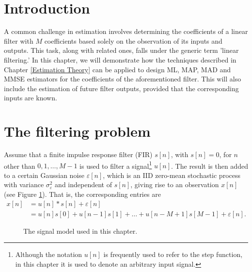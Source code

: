 
\section{Introduction}

A common challenge in estimation involves determining the coefficients of a linear filter with $M$ coefficients based solely on the observation of its inputs and outputs. This task, along with related ones, falls under the generic term 'linear filtering.' In this chapter, we will demonstrate how the techniques described in Chapter \ref{Estimation Theory} can be applied to design ML, MAP, MAD and MMSE estimators for the coefficients of the aforementioned filter. This will also include the estimation of future filter outputs, provided that the corresponding inputs are known.

\section{The filtering problem}

Assume that a finite impulse response filter (FIR) $s[n]$, with $s[n]=0$, for $n$ other than $0,1, \ldots, M-1$ is used to filter a signal\footnote{Although the notation $u[n]$ is frequently used to refer to the step function, in this chapter it is used to denote an arbitrary input signal.} $u[n]$. The result is then added to a certain Gaussian noise $\varepsilon[n]$, which is an IID zero-mean stochastic process with variance $\sigma_\varepsilon^2 $ and independent of $s[n]$, giving rise to an observation $x[n]$ (see Figure \ref{fig:linear_filter}). That is, the corresponding entries are
\begin{align}
x[n] &= u[n]*s[n] + \varepsilon[n]     \nonumber\\
     & = u[n]s[0] + u[n-1]s[1] + \ldots + u[n-M+1]s[M-1] + \varepsilon[n].
\end{align}

\begin{figure}[htb]  %
    \centering
\caption{The signal model used in this chapter.}
\label{fig:linear_filter}
\end{figure}

